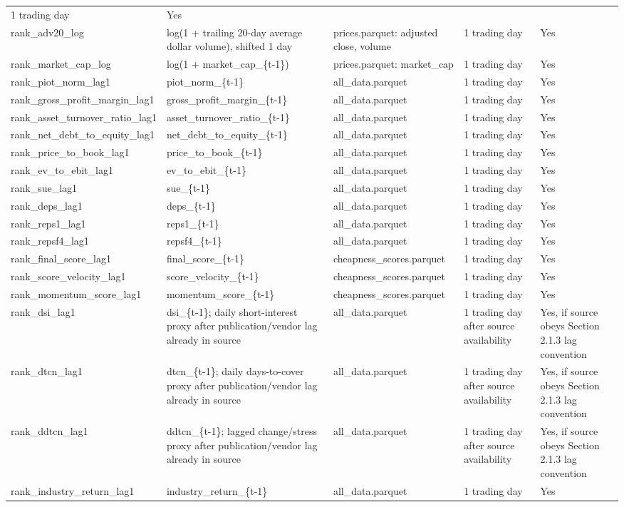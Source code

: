 \documentclass[
]{article}
\begin{document}
\begin{longtable}[]{@{}lllll@{}}
1 trading day & Yes \\
rank\_adv20\_log & log(1 + trailing 20-day average dollar volume),
shifted 1 day & prices.parquet: adjusted close, volume & 1 trading day &
Yes \\
rank\_market\_cap\_log & log(1 + market\_cap\_\{t-1\}) & prices.parquet:
market\_cap & 1 trading day & Yes \\
rank\_piot\_norm\_lag1 & piot\_norm\_\{t-1\} & all\_data.parquet & 1
trading day & Yes \\
rank\_gross\_profit\_margin\_lag1 & gross\_profit\_margin\_\{t-1\} &
all\_data.parquet & 1 trading day & Yes \\
rank\_asset\_turnover\_ratio\_lag1 & asset\_turnover\_ratio\_\{t-1\} &
all\_data.parquet & 1 trading day & Yes \\
rank\_net\_debt\_to\_equity\_lag1 & net\_debt\_to\_equity\_\{t-1\} &
all\_data.parquet & 1 trading day & Yes \\
rank\_price\_to\_book\_lag1 & price\_to\_book\_\{t-1\} &
all\_data.parquet & 1 trading day & Yes \\
rank\_ev\_to\_ebit\_lag1 & ev\_to\_ebit\_\{t-1\} & all\_data.parquet & 1
trading day & Yes \\
rank\_sue\_lag1 & sue\_\{t-1\} & all\_data.parquet & 1 trading day &
Yes \\
rank\_deps\_lag1 & deps\_\{t-1\} & all\_data.parquet & 1 trading day &
Yes \\
rank\_reps1\_lag1 & reps1\_\{t-1\} & all\_data.parquet & 1 trading day &
Yes \\
rank\_repsf4\_lag1 & repsf4\_\{t-1\} & all\_data.parquet & 1 trading day
& Yes \\
rank\_final\_score\_lag1 & final\_score\_\{t-1\} &
cheapness\_scores.parquet & 1 trading day & Yes \\
rank\_score\_velocity\_lag1 & score\_velocity\_\{t-1\} &
cheapness\_scores.parquet & 1 trading day & Yes \\
rank\_momentum\_score\_lag1 & momentum\_score\_\{t-1\} &
cheapness\_scores.parquet & 1 trading day & Yes \\
rank\_dsi\_lag1 & dsi\_\{t-1\}; daily short-interest proxy after
publication/vendor lag already in source & all\_data.parquet & 1 trading
day after source availability & Yes, if source obeys Section 2.1.3 lag
convention \\
rank\_dtcn\_lag1 & dtcn\_\{t-1\}; daily days-to-cover proxy after
publication/vendor lag already in source & all\_data.parquet & 1 trading
day after source availability & Yes, if source obeys Section 2.1.3 lag
convention \\
rank\_ddtcn\_lag1 & ddtcn\_\{t-1\}; lagged change/stress proxy after
publication/vendor lag already in source & all\_data.parquet & 1 trading
day after source availability & Yes, if source obeys Section 2.1.3 lag
convention \\
rank\_industry\_return\_lag1 & industry\_return\_\{t-1\} &
all\_data.parquet & 1 trading day & Yes \\
\bottomrule
\end{longtable}
\end{document}
